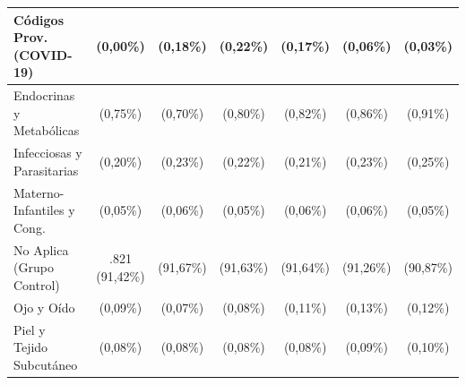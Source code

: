 \begin{table}[htbp]
\begin{tabular}{|l|c|c|c|c|c|c|}
\parbox[t]{3.8cm}{Códigos Prov. (COVID-19)} & \parbox[t]{1.5cm}{ (0,00\%)} & \parbox[t]{1.5cm}{ (0,18\%)} & \parbox[t]{1.5cm}{ (0,22\%)} & \parbox[t]{1.5cm}{ (0,17\%)} & \parbox[t]{1.5cm}{ (0,06\%)} & \parbox[t]{1.5cm}{ (0,03\%)} \\ \hline
\parbox[t]{3.8cm}{Endocrinas y Metabólicas} & \parbox[t]{1.5cm}{ (0,75\%)} & \parbox[t]{1.5cm}{ (0,70\%)} & \parbox[t]{1.5cm}{ (0,80\%)} & \parbox[t]{1.5cm}{ (0,82\%)} & \parbox[t]{1.5cm}{ (0,86\%)} & \parbox[t]{1.5cm}{ (0,91\%)} \\ \hline
\parbox[t]{3.8cm}{Infecciosas y Parasitarias} & \parbox[t]{1.5cm}{ (0,20\%)} & \parbox[t]{1.5cm}{ (0,23\%)} & \parbox[t]{1.5cm}{ (0,22\%)} & \parbox[t]{1.5cm}{ (0,21\%)} & \parbox[t]{1.5cm}{ (0,23\%)} & \parbox[t]{1.5cm}{ (0,25\%)} \\ \hline
\parbox[t]{3.8cm}{Materno-Infantiles y Cong.} & \parbox[t]{1.5cm}{ (0,05\%)} & \parbox[t]{1.5cm}{ (0,06\%)} & \parbox[t]{1.5cm}{ (0,05\%)} & \parbox[t]{1.5cm}{ (0,06\%)} & \parbox[t]{1.5cm}{ (0,06\%)} & \parbox[t]{1.5cm}{ (0,05\%)} \\ \hline
\parbox[t]{3.8cm}{No Aplica (Grupo Control)} & \parbox[t]{1.5cm}{.821 (91,42\%)} & \parbox[t]{1.5cm}{ (91,67\%)} & \parbox[t]{1.5cm}{ (91,63\%)} & \parbox[t]{1.5cm}{ (91,64\%)} & \parbox[t]{1.5cm}{ (91,26\%)} & \parbox[t]{1.5cm}{ (90,87\%)} \\ \hline
\parbox[t]{3.8cm}{Ojo y Oído} & \parbox[t]{1.5cm}{ (0,09\%)} & \parbox[t]{1.5cm}{ (0,07\%)} & \parbox[t]{1.5cm}{ (0,08\%)} & \parbox[t]{1.5cm}{ (0,11\%)} & \parbox[t]{1.5cm}{ (0,13\%)} & \parbox[t]{1.5cm}{ (0,12\%)} \\ \hline
\parbox[t]{3.8cm}{Piel y Tejido Subcutáneo} & \parbox[t]{1.5cm}{ (0,08\%)} & \parbox[t]{1.5cm}{ (0,08\%)} & \parbox[t]{1.5cm}{ (0,08\%)} & \parbox[t]{1.5cm}{ (0,08\%)} & \parbox[t]{1.5cm}{ (0,09\%)} & \parbox[t]{1.5cm}{ (0,10\%)} \\ \hline

\end{tabular}
\end{table}
